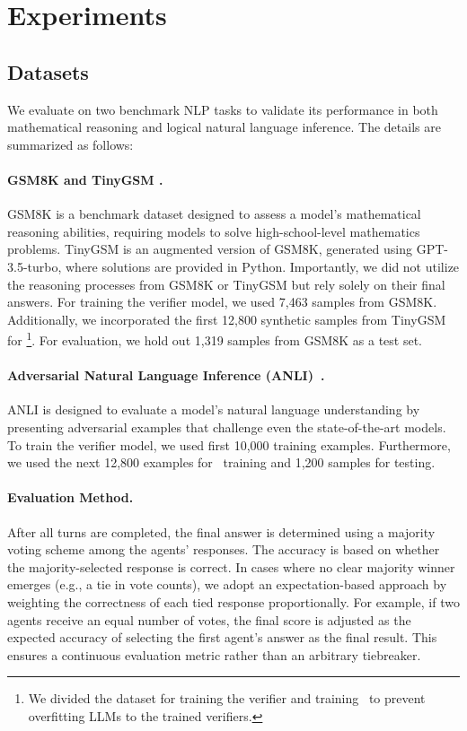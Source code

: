 \safevspace{-2mm}
\section{Experiments}
\label{sec:exp}

\safevspace{-2mm}
\subsection{Datasets}
\safevspace{-1mm}

We evaluate \oursspace on  two benchmark NLP tasks to validate its performance in both mathematical reasoning and logical natural language inference. The details are summarized as follows:
\safevspace{-2mm}

\paragraph{GSM8K \citep{cobbe2021training} and TinyGSM \citep{liu2023tinygsm}.} 
GSM8K is a benchmark dataset designed to assess a model's mathematical reasoning abilities, requiring models to solve high-school-level mathematics problems. TinyGSM is an augmented version of GSM8K, generated using GPT-3.5-turbo, where solutions are provided in Python. Importantly, we did not utilize the reasoning processes from GSM8K or TinyGSM but rely solely on their final answers. For training the verifier model, we used 7,463 samples from GSM8K. Additionally, we incorporated the first 12,800 synthetic samples from TinyGSM for \ours\footnote{We divided the dataset for training the verifier and training \ours~to prevent overfitting LLMs to the trained verifiers.}. For evaluation, we hold out 1,319 samples from GSM8K as a test set. 

\paragraph{Adversarial Natural Language Inference (ANLI)~\citep{nie2019adversarial}.}
ANLI is designed to evaluate a model’s natural language understanding by presenting adversarial examples that challenge even the state-of-the-art models. To train the verifier model, we used first 10,000 training examples. Furthermore, we used the next 12,800 examples for \ours~training and 1,200 samples for testing.

\paragraph{Evaluation Method.} 
After all turns are completed, the final answer is determined using a majority voting scheme among the agents' responses. The accuracy is based on whether the majority-selected response is correct.
In cases where no clear majority winner emerges (e.g., a tie in vote counts), we adopt an expectation-based approach by weighting the correctness of each tied response proportionally. For example, if two agents receive an equal number of votes, the final score is adjusted as the expected accuracy of selecting the first agent’s answer as the final result. This ensures a continuous evaluation metric rather than an arbitrary tiebreaker.


